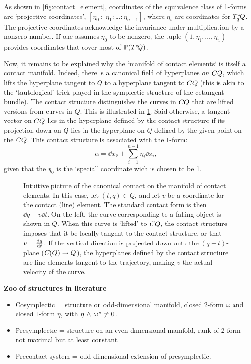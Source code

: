 As shown in \cref{fig:contact_element}, coordinates of the equivalence class of 1-forms are `projective coordinates', $[\eta_0\;:\;\eta_1:\ldots :\eta_{n-1}]$, where $\eta_i$ are coordinates for $T_q^*\!Q$. The projective coordinates acknowledge the invariance under multiplication by a nonzero number. If one assumes $\eta_0$ to be nonzero, the tuple $(1, \eta_1, \ldots, \eta_n)$ provides coordinates that cover most of $\mathbb{P}\qty(T^*\!Q)$. 

Now, it remains to be explained why the `manifold of contact elements` is itself a contact manifold. Indeed, there is a canonical field of hyperplanes \emph{on} $CQ$, which lifts the hyperplane tangent to $Q$ to a hyperplane tangent to $CQ$ (this is akin to the `tautological' trick played in the symplectic structure of the cotangent bundle). The contact structure distinguishes the curves in $CQ$ that are lifted versions from curves in $Q$. This is illustrated in \cref{fig:contact_lift}. \cite{Burke1985}
Said otherwise, a tangent vector on $CQ$ lies in the hyperplane defined by the contact structure if its projection down on $Q$ lies in the hyperplane on $Q$ defined by the given point on the $CQ$. This contact structure is associated with the 1-form:
$$ \alpha = \dd{x}_0 + \sum_{i = 1}^{n-1} \eta_i\dd{x}_i,$$
given that the $\eta_0$ is the `special' coordinate wich is chosen to be 1.

\begin{figure}[h!]
    \begin{center}
        
    \end{center}
    \caption{Intuitive picture of the canonical contact on the manifold of contact elements. In this case, let $ (t, q) \in Q$, and let $v$ be a coordinate for the contact (line) element. The standard contact form is then $\dd{q} - v\dd{t}$. On the left, the curve corresponding to a falling object is shown in $Q$. When this curve is `lifted' to $CQ$, the contact structure imposes that it be locally tangent to the contact structure, or that $v = \dv{q}{t}$. If the vertical direction is projected down onto the $(q-t)$-plane ($C(Q) \to Q$), the hyperplanes defined by the contact structure are line elements tangent to the trajectory, making $v$ the actual velocity of the curve.}
    \label{fig:contact_lift}
\end{figure}

\textbf{Zoo of structures in literature}
\begin{itemize}
    \item Cosymplectic = structure on odd-dimensional manifold, closed 2-form $\omega$ and closed 1-form $\eta$, with $ \eta\,\wedge\,\omega^n  \neq 0$. 
    \item Presymplectic = structure on an even-dimensional manifold, rank of 2-form not maximal but at least constant.
    \item Precontact system = odd-dimensional extension of presymplectic.
\end{itemize}

